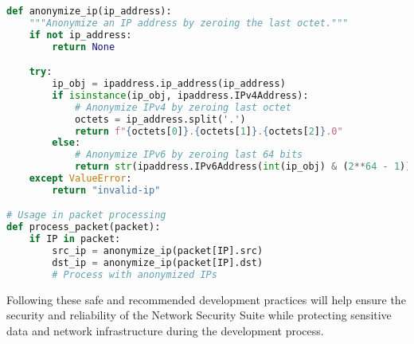 \begin{lstlisting}[language=python, caption=Data Anonymization Example]
def anonymize_ip(ip_address):
    """Anonymize an IP address by zeroing the last octet."""
    if not ip_address:
        return None

    try:
        ip_obj = ipaddress.ip_address(ip_address)
        if isinstance(ip_obj, ipaddress.IPv4Address):
            # Anonymize IPv4 by zeroing last octet
            octets = ip_address.split('.')
            return f"{octets[0]}.{octets[1]}.{octets[2]}.0"
        else:
            # Anonymize IPv6 by zeroing last 64 bits
            return str(ipaddress.IPv6Address(int(ip_obj) & (2**64 - 1)))
    except ValueError:
        return "invalid-ip"

# Usage in packet processing
def process_packet(packet):
    if IP in packet:
        src_ip = anonymize_ip(packet[IP].src)
        dst_ip = anonymize_ip(packet[IP].dst)
        # Process with anonymized IPs
\end{lstlisting}

Following these safe and recommended development practices will help ensure the security and reliability of the Network Security Suite while protecting sensitive data and network infrastructure during the development process.
